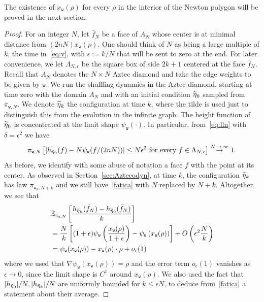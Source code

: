 \documentclass[AHL,Unicode,longabstracts,published]{cedram}
\newcommand{\ttw}{\mathtt{w}}
\newcommand{\bbE}{\mathbb{E}}
\let\oldtilde\tilde
\renewcommand*{\tilde}[1]{\mathchoice{\widetilde{#1}}{\widetilde{#1}}{\oldtilde{#1}}{\oldtilde{#1}}}
\newcommand{\ttw}{\mathtt{w}}
\begin{document}
The existence of $x_{\ttw}(\rho)$ for every $\rho$ in the interior of the Newton polygon will be proved in the next section.


\begin{proof}
For an integer $N$, let $\bar f_N$ be a face of $A_N$ whose center is at minimal distance from $(2nN) x_{\ttw}(\rho)$. One should think of $N$ as being a large multiple of $k$, the time in~\eqref{eq:v}, with $\epsilon:=k/N$ that will be sent to zero at the end. For later convenience, we let $\Lambda_{N,\epsilon}$ be the square box of side $2k+1$ centered at the face $\bar f_N$. Recall that $A_N$ denotes the $N\times N$ Aztec diamond and take the edge weights to be given by $\ttw$. We run the shuffling dynamics in the Aztec diamond, starting at time zero with the domain $A_N$ and with an initial condition $\tilde \eta_0$ sampled from $\pi_{\ttw,N}$. We denote $\tilde \eta_k$ the configuration at time $k$, where the tilde is used just to distinguish this from the evolution in the infinite graph. The height function of $\tilde\eta_0$ is concentrated at the limit shape $\psi_{\ttw}(\cdot)$. In particular, from~\eqref{eq:lln} with $\delta=\epsilon^2$ we have
\begin{equation}\label{fatica}
\pi_{\ttw,N} \left[\left|h_{\tilde \eta_0}(f)- N \psi_{\ttw}(f/(2nN))\right|\le N \epsilon^2 \text{ for every } f\in \Lambda_{N,\epsilon}\right]\stackrel{N\,\to\,\infty}\to1.
\end{equation}
As before, we identify with some abuse of notation a face $f$ with the point at its center. As observed in Section~\ref{sec:Aztecodyn}, at time $k$, the configuration $\tilde \eta_k$ has law $\pi_{\ttw_k,N+k}$ and we still have~\eqref{fatica} with $N$ replaced by $N+k$. Altogether, we see that
\begin{equation}\label{eq:perA}
\begin{split}
&\bbE_{\pi_{\ttw,N}}\left[\frac{ h_{\tilde \eta_k}(\bar f_N)-h_{\tilde \eta_0}(\bar f_N)}k\right]\\
&=\frac Nk\left[(1+\epsilon)\psi_{\ttw}\left(\frac{x_{\ttw}(\rho)}{1+\epsilon}\right) - \psi_{\ttw}\left(x_{\ttw}(\rho)\right)\right]+O\left(\epsilon^2 \frac Nk\right)\\
&= \psi_{\ttw}(x_{\ttw}(\rho))-x_{\ttw}(\rho)\cdot \rho+o_\epsilon(1)
\end{split}
\end{equation}
where we used that $\nabla\psi_{\ttw}(x_{\ttw}(\rho))=\rho$ and the error term $o_\epsilon(1)$ vanishes as $\epsilon\to0$, since the limit shape is $C^1$ around $x_{\mathtt w}(\rho)$. We also used the fact that $|h_{\tilde \eta_0}|/N, |h_{\tilde \eta_k}|/N$ are uniformly bounded for $k\le \epsilon N$, to deduce from~\eqref{fatica} a statement about their average.


\end{proof}
\end{document}
